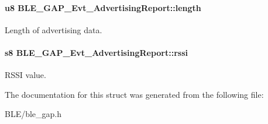 \paragraph[{\texorpdfstring{length}{length}}]{\setlength{\rightskip}{0pt plus 5cm}u8 B\+L\+E\+\_\+\+G\+A\+P\+\_\+\+Evt\+\_\+\+Advertising\+Report\+::length}\hypertarget{struct_b_l_e___g_a_p___evt___advertising_report_a2febfcc770413b92c5258fc82cf9771d}{}\label{struct_b_l_e___g_a_p___evt___advertising_report_a2febfcc770413b92c5258fc82cf9771d}
Length of advertising data. 
\paragraph[{\texorpdfstring{rssi}{rssi}}]{\setlength{\rightskip}{0pt plus 5cm}s8 B\+L\+E\+\_\+\+G\+A\+P\+\_\+\+Evt\+\_\+\+Advertising\+Report\+::rssi}\hypertarget{struct_b_l_e___g_a_p___evt___advertising_report_a73e74502aebf254922c809afd71d9661}{}\label{struct_b_l_e___g_a_p___evt___advertising_report_a73e74502aebf254922c809afd71d9661}
R\+S\+SI value. 

The documentation for this struct was generated from the following file\+:\begin{DoxyCompactItemize}
\item 
B\+L\+E/ble\+\_\+gap.\+h\end{DoxyCompactItemize}
